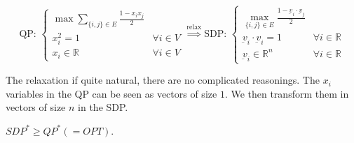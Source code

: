     \begin{equation}
        \text{QP:~}
        \begin{cases}
            \max \sum_{\{i,j\} \in E} \frac{1 - x_i x_j}{2}\\
            x_i^2 = 1           & \forall i \in V\\
            x_i \in \mathbb{R}  & \forall i \in V
        \end{cases}
        \overset{\text{relax}}{\implies} \text{SDP:~}
        \begin{cases}
            \max_{\{i,j\} \in E} \frac{1 - \underbar{v}_i \cdot \underbar{v}_j}{2}\\
            \underbar{v}_i \cdot \underbar{v}_i = 1 & \forall i \in \mathbb{R}\\
            \underbar{v}_i \in \mathbb{R}^n         & \forall i \in \mathbb{R}
        \end{cases}
    \end{equation}

    The relaxation if quite natural, there are no complicated reasonings.
    The $x_i$ variables in the QP can be seen as vectors of size $1$. We then transform them in vectors of size $n$ in the SDP.

    \begin{lemma}
        $SDP^* \geq QP^* (= OPT)$.
    \end{lemma}

